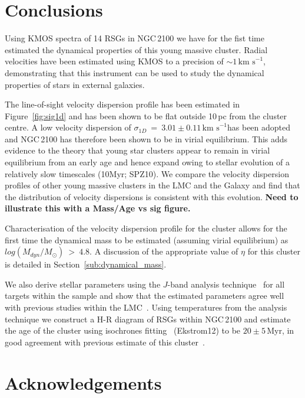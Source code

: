 \documentclass[useAMS,usenatbib]{mn2e}
\def\kms{$\mbox{km s}^{-1}$}
\begin{document}

\section{Conclusions} %
\label{sec:conclusions}

Using KMOS spectra of 14 RSGs in NGC\,2100 we have for the fist time estimated the dynamical properties of this young massive cluster.
Radial velocities have been estimated using KMOS to a precision of $\sim1$\,\kms, demonstrating that this instrument can be used to study the dynamical properties of stars in external galaxies.

The line-of-sight velocity dispersion profile has been estimated in Figure~\ref{fig:sig1d} and has been shown to be flat outside 10\,pc from the cluster centre.
A low velocity dispersion of $\sigma_{1D}~=~3.01\pm0.11\,$\kms has been adopted and NGC\,2100 has therefore been shown to be in virial equilibrium.
This adds evidence to the theory that young star clusters appear to remain in virial equilibrium from an early age and hence expand owing to stellar evolution of a relatively slow timescales (10Myr; SPZ10).
We compare the velocity dispersion profiles of other young massive clusters in the LMC and the Galaxy and find that the distribution of velocity dispersions is consistent with this evolution.
\textbf{Need to illustrate this with a Mass/Age vs sig figure.}

Characterisation of the velocity dispersion profile for the cluster allows for the first time the dynamical mass to be estimated (assuming virial equilibrium) as $log(M_{dyn}/M_{\odot})~>~4.8$.
A discussion of the appropriate value of $\eta$ for this cluster is detailed in Section~\ref{sub:dynamical_mass}.

We also derive stellar parameters using the $J$-band analysis technique~\citep{2010MNRAS.407.1203D} for all targets within the sample and show that the estimated parameters agree well with previous studies within the LMC~\citep{2015ApJ...806...21D}.
Using temperatures from the analysis technique we construct a H-R diagram of RSGs within NGC\,2100 and estimate the age of the cluster using isochrones fitting~\citep{2013A&A...558A.103G} (Ekstrom12) to be $20\pm5\,$Myr, in good agreement with previous estimate of this cluster~\citep{2015A&A...575A..62N}.



\section*{Acknowledgements}
\end{document}

